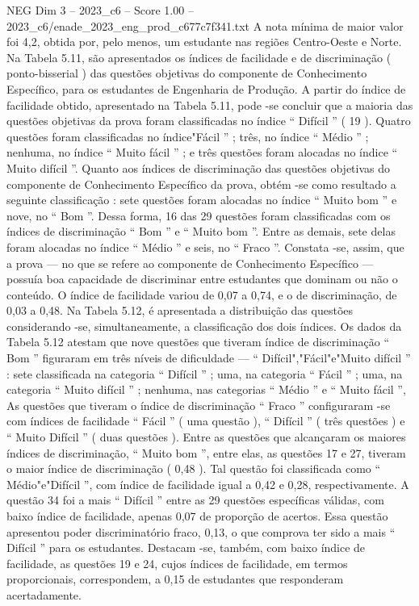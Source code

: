 \begin{textsample}{NEG Dim 3 – 2023\_c6 – Score 1.00 – 2023\_c6/enade\_2023\_eng\_prod\_c677c7f341.txt}
A nota mínima de maior valor foi 4,2, obtida por, pelo menos, um estudante nas regiões Centro-Oeste e Norte.
Na Tabela 5.11, são apresentados os índices de facilidade e de discriminação ( ponto-bisserial ) das questões objetivas do componente de Conhecimento Específico, para os estudantes de Engenharia de Produção.
A partir do índice de facilidade obtido, apresentado na Tabela 5.11, pode -se concluir que a maioria das questões objetivas da prova foram classificadas no índice “ Difícil ” ( 19 ).
Quatro questões foram classificadas no índice"Fácil ” ; três, no índice “ Médio ” ; nenhuma, no índice “ Muito fácil ” ; e três questões foram alocadas no índice “ Muito difícil ”.
Quanto aos índices de discriminação das questões objetivas do componente de Conhecimento Específico da prova, obtém -se como resultado a seguinte classificação : sete questões foram alocadas no índice “ Muito bom ” e nove, no “ Bom ”.
Dessa forma, 16 das 29 questões foram classificadas com os índices de discriminação “ Bom ” e “ Muito bom ”.
Entre as demais, sete delas foram alocadas no índice “ Médio ” e seis, no “ Fraco ”.
Constata -se, assim, que a prova — no que se refere ao componente de Conhecimento Específico — possuía boa capacidade de discriminar entre estudantes que dominam ou não o conteúdo.
O índice de facilidade variou de 0,07 a 0,74, e o de discriminação, de 0,03 a 0,48.
Na Tabela 5.12, é apresentada a distribuição das questões considerando -se, simultaneamente, a classificação dos dois índices.
Os dados da Tabela 5.12 atestam que nove questões que tiveram índice de discriminação “ Bom ” figuraram em três níveis de dificuldade — “ Difícil","Fácil"e"Muito difícil ” : sete classificada na categoria “ Difícil ” ; uma, na categoria “ Fácil ” ; uma, na categoria “ Muito difícil ” ; nenhuma, nas categorias “ Médio ” e “ Muito fácil ”, As questões que tiveram o índice de discriminação “ Fraco ” configuraram -se com índices de facilidade “ Fácil ” ( uma questão ), “ Difícil ” ( três questões ) e “ Muito Difícil ” ( duas questões ).
Entre as questões que alcançaram os maiores índices de discriminação, “ Muito bom ”, entre elas, as questões 17 e 27, tiveram o maior índice de discriminação ( 0,48 ).
Tal questão foi classificada como “ Médio"e"Difícil ”, com índice de facilidade igual a 0,42 e 0,28, respectivamente.
A questão 34 foi a mais “ Difícil ” entre as 29 questões específicas válidas, com baixo índice de facilidade, apenas 0,07 de proporção de acertos.
Essa questão apresentou poder discriminatório fraco, 0,13, o que comprova ter sido a mais “ Difícil ” para os estudantes.
Destacam -se, também, com baixo índice de facilidade, as questões 19 e 24, cujos índices de facilidade, em termos proporcionais, correspondem, a 0,15 de estudantes que responderam acertadamente.

\end{textsample}
